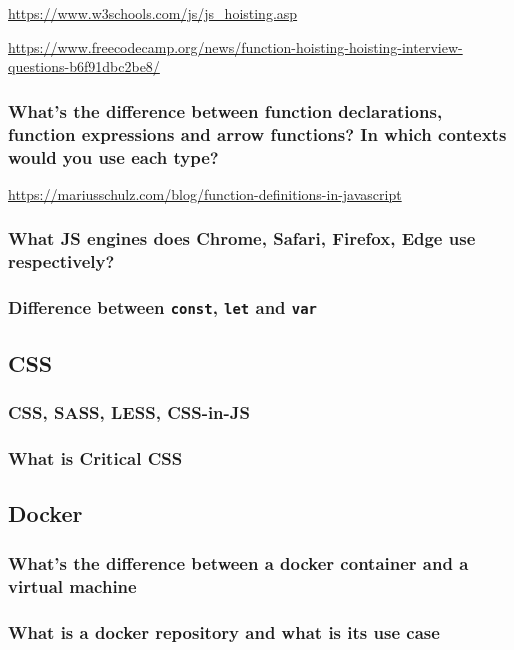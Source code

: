 \documentclass[12pt, a4paper]{article}
\newcommand{\code}[1]{\texttt{#1}}
\begin{document}
\url{https://www.w3schools.com/js/js_hoisting.asp}

\url{https://www.freecodecamp.org/news/function-hoisting-hoisting-interview-questions-b6f91dbc2be8/}

\subsubsection*{What's the difference between function declarations, function expressions and arrow functions? In which contexts would you use each type? }

\url{https://mariusschulz.com/blog/function-definitions-in-javascript}


\subsubsection*{What JS engines does Chrome, Safari, Firefox, Edge use respectively?}

\subsubsection*{Difference between \code{const}, \code{let} and \code{var}}

\pagebreak

\subsection*{CSS}
\subsubsection*{CSS, SASS, LESS, CSS-in-JS}

\subsubsection*{What is Critical CSS}

\pagebreak

\subsection*{Docker}
\subsubsection*{What's the difference between a docker container and a virtual machine}

\subsubsection*{What is a docker repository and what is its use case}
\end{document}
